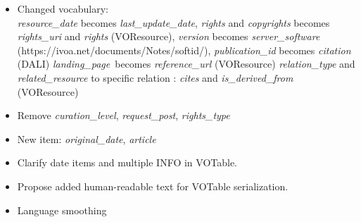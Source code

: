 \documentclass[11pt,a4paper]{ivoa}
\begin{document}
\begin{itemize}
\item Changed vocabulary: \\
  \textit{resource\_date} becomes \textit{last\_update\_date},
  \textit{rights} and \textit{copyrights} becomes \textit{rights\_uri} and \textit{rights} (VOResource),
  \textit{version} becomes \textit{server\_software} (https://ivoa.net/documents/Notes/softid/),
  \textit{publication\_id} becomes \textit{citation} (DALI)
  \textit{landing\_page} becomes \textit{reference\_url} (VOResource)
  \textit{relation\_type} and \textit{related\_resource} to specific relation : \textit{cites} and \textit{is\_derived\_from} (VOResource)
\item Remove \textit{curation\_level}, 
      \textit{request\_post}, 
      \textit{rights\_type}
\item New item: \textit{original\_date}, \textit{article}
\item Clarify date items and multiple INFO in VOTable.
\item Propose added human-readable text for VOTable serialization.
\item Language smoothing
\end{itemize}


\end{document}
